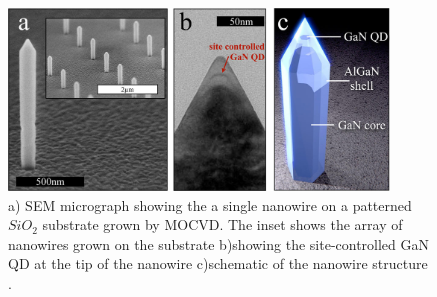 \begin{figure}[h]
	\centering
	\includegraphics[width=0.9\textwidth]{Figs/Ch1/homey.png}
	\caption {a) SEM micrograph showing the a single nanowire on a patterned $SiO_{2}$ substrate grown by MOCVD. The inset shows the array of nanowires grown on the substrate b)showing the site-controlled GaN QD at the tip of the nanowire c)schematic of the nanowire structure \cite{Holmes2014}.} 
	\label{homey}
\end{figure}
\FloatBarrier 

